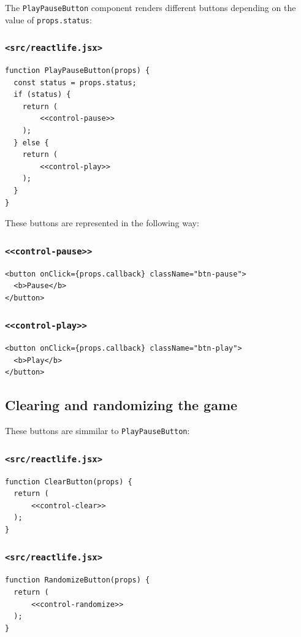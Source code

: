 \documentclass[11pt]{article}
\begin{document}
The \texttt{PlayPauseButton} component renders different buttons depending on the value of \texttt{props.status}:

\subsubsection*{\texttt{<src/reactlife.jsx>}}
\label{sec:orgd06e054}
\begin{verbatim}
function PlayPauseButton(props) {
  const status = props.status;
  if (status) {
    return (
        <<control-pause>>
    );
  } else {
    return ( 
        <<control-play>>
    );
  }
}
\end{verbatim}

These buttons are represented in the following way:

\subsubsection*{\texttt{<<control-pause>>}}
\label{sec:org38bf405}
\begin{verbatim}
<button onClick={props.callback} className="btn-pause">
  <b>Pause</b>
</button>
\end{verbatim}

\subsubsection*{\texttt{<<control-play>>}}
\label{sec:orgbc39e4d}
\begin{verbatim}
<button onClick={props.callback} className="btn-play">
  <b>Play</b>
</button>
\end{verbatim}

\subsection{Clearing and randomizing the game}
\label{sec:orgb06bee8}

These buttons are simmilar to \texttt{PlayPauseButton}:

\subsubsection*{\texttt{<src/reactlife.jsx>}}
\label{sec:orge15bfa7}
\begin{verbatim}
function ClearButton(props) {
  return ( 
      <<control-clear>>
  );
}
\end{verbatim}

\subsubsection*{\texttt{<src/reactlife.jsx>}}
\label{sec:orga400627}
\begin{verbatim}
function RandomizeButton(props) {
  return (
      <<control-randomize>> 
  );
}
\end{verbatim}
\end{document}
